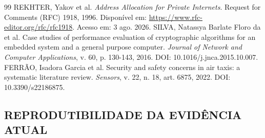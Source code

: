 \documentclass[12pt,openright,twoside,a4paper,english,brazil]{abntex2}
\begin{document}
\begin{thebibliography}{99}
 REKHTER, Yakov et al. \textit{Address Allocation for Private Internets}. Request for Comments (RFC) 1918, 1996. Disponível em: \url{https://www.rfc-editor.org/rfc/rfc1918}. Acesso em: 3 ago. 2026.
 SILVA, Natassya Barlate Floro da et al. Case studies of performance evaluation of cryptographic algorithms for an embedded system and a general purpose computer. \textit{Journal of Network and Computer Applications}, v. 60, p. 130-143, 2016. DOI: 10.1016/j.jnca.2015.10.007.
 FERRÃO, Isadora Garcia et al. Security and safety concerns in air taxis: a systematic literature review. \textit{Sensors}, v. 22, n. 18, art. 6875, 2022. DOI: 10.3390/s22186875.
\end{thebibliography}

\begin{apendicesenv}
\chapter{REPRODUTIBILIDADE DA EVIDÊNCIA ATUAL}
\label{cap:reprodutibilidade}


\end{apendicesenv}
\end{document}
